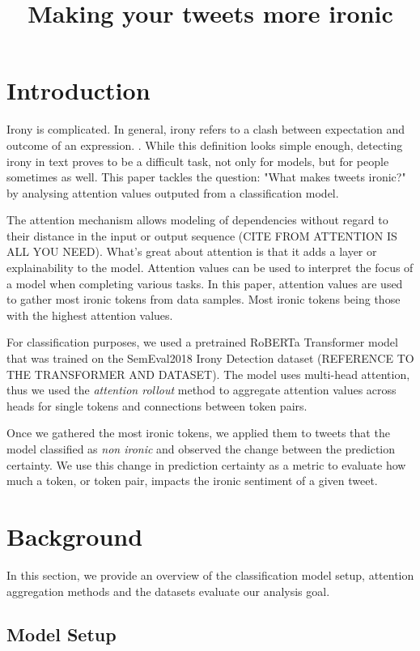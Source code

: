 \documentclass[10pt, a4paper]{article}
\title{Making your tweets more ironic}
\begin{document}
\maketitleabstract

\section{Introduction}

Irony is complicated.
In general, irony refers to a clash between expectation and outcome of an expression. \citep{kreutz-20}. 
While this definition looks simple enough, detecting irony in text proves to be a difficult task, not only for models, but for people sometimes as well.
This paper tackles the question: "What makes tweets ironic?" by analysing attention values outputed from a classification model.

The attention mechanism allows modeling of dependencies without regard to their distance in the input or output sequence (CITE FROM ATTENTION IS ALL YOU NEED).
What's great about attention is that it adds a layer or explainability to the model. Attention values can be used to interpret the focus of a model when completing various tasks.
In this paper, attention values are used to gather most ironic tokens from data samples. Most ironic tokens being those with the highest attention values.

For classification purposes, we used a pretrained RoBERTa Transformer model that was trained on the SemEval2018 Irony Detection dataset (REFERENCE TO THE TRANSFORMER AND DATASET).
The model uses multi-head attention, thus we used the \textit{attention rollout} method to aggregate attention values across heads for single tokens and connections between token pairs.

Once we gathered the most ironic tokens, we applied them to tweets that the model classified as \textit{non ironic} and observed the change between the prediction certainty.
We use this change in prediction certainty as a metric to evaluate how much a token, or token pair, impacts the ironic sentiment of a given tweet.

\section{Background}

In this section, we provide an overview of the classification model setup, attention aggregation methods and the datasets evaluate our analysis goal.

\subsection{Model Setup}
\label{sec:first}
\end{document}
